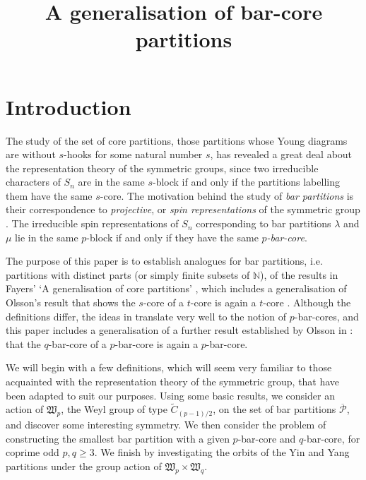 \documentclass[ALCO, Unicode,published]{cedram}
\title{A generalisation of bar-core partitions}
\author[\initial{D.} Yates]{\firstname{Dean} \lastname{Yates}}
\begin{document}
\maketitle



\section{Introduction}
 
The study of the set of core partitions, those partitions whose Young diagrams are without $s$-hooks for some natural number $s$, has revealed a great deal about the representation theory of the symmetric groups, since two irreducible characters of $S_n$ are in the same $s$-block if and only if the partitions labelling them have the same $s$-core. The motivation behind the study of \textit{bar partitions} is their correspondence to \textit{projective}, or \textit{spin representations} of the symmetric group \cite{HH}. The irreducible spin representations of $S_n$ corresponding to bar partitions $\lambda$ and $\mu$ lie in the same $p$-block if and only if they have the same $p$\textit{-bar-core}.  

The purpose of this paper is to establish analogues for bar partitions, i.e. partitions with distinct parts (or simply finite subsets of $\mathbb{N}$), of the results in Fayers' `A generalisation of core partitions' \cite{F1}, which includes a generalisation of Olsson's result that shows the $s$-core of a $t$-core is again a $t$-core \cite{O2}. Although the definitions differ, the ideas in \cite{F1} translate very well to the notion of $p$-bar-cores, and this paper includes a generalisation of a further result established by Olsson in \cite{O2}: that the $q$-bar-core of a $p$-bar-core is again a $p$-bar-core. 

We will begin with a few definitions, which will seem very familiar to those acquainted with the representation theory of the symmetric group, that have been adapted to suit our purposes. Using some basic results, we consider an action of $\mathfrak{W}_p$, the Weyl group of type $\tilde{C}_{(p-1)/2}$, on the set of bar partitions $\overline{\mathcal{P}}$, and discover some interesting symmetry. We then consider the problem of constructing the smallest bar partition with a given $p$-bar-core and $q$-bar-core, for coprime odd $p,q\geq3$. We finish by investigating the orbits of the Yin and Yang partitions \cite{BO} under the group action of $\mathfrak{W}_p\times\mathfrak{W}_q$. 
\end{document}
